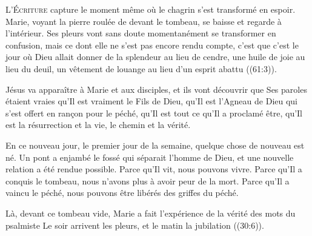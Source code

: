 \dvrule







\lettrine{L}{'Écriture} capture le moment même où le chagrin
 s'est transformé en espoir. Marie, voyant la pierre roulée
 de devant le tombeau, se baisse et regarde à l'intérieur.
 Ses pleurs vont sans doute momentanément se transformer en confusion,
 mais ce dont elle ne s'est pas encore rendu compte,
 c'est que c'est le jour où Dieu allait donner \Og de la splendeur
 au lieu de cendre, une huile de joie au lieu du deuil,
 un vêtement de louange au lieu d'un esprit abattu \Fg{}
 ((61:3)).


Jésus va apparaître à Marie et aux disciples, et ils vont découvrir
 que Ses paroles étaient vraies \ocadr qu'Il est vraiment le Fils de Dieu,
 qu'Il est l'Agneau de Dieu qui s'est offert en ran\c{c}on pour le péché,
 qu'Il est tout ce qu'Il a proclamé être, qu'Il est la résurrection et la vie,
 le chemin et la vérité.

En ce nouveau jour, le premier jour de la semaine,
 quelque chose de nouveau est né. Un pont a enjambé le fossé
 qui séparait l'homme de Dieu, et une nouvelle relation a été rendue possible.
 Parce qu'Il vit, nous pouvons vivre. Parce qu'Il a conquis le tombeau,
 nous n'avons plus à avoir peur de la mort. Parce qu'Il a vaincu le péché,
 nous pouvons être libérés des griffes du péché.

Là, devant ce tombeau vide, Marie a fait l'expérience de la vérité
 des mots du psalmiste\frcolon{}
 \Og Le soir arrivent les pleurs, et le matin la jubilation \Fg{}
 ((30:6)).

\dvrule

